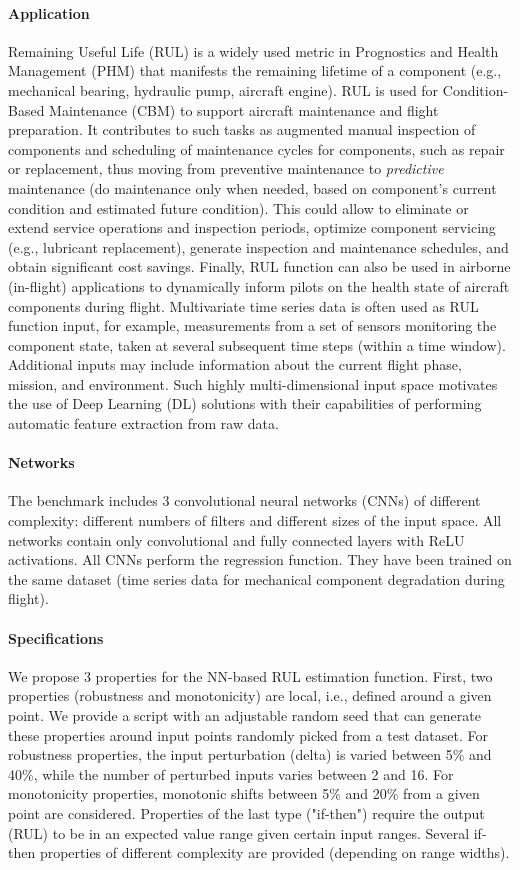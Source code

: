 \documentclass[oneside,11pt,dvipsnames]{book}
\begin{document}
\paragraph*{Application} Remaining Useful Life (RUL) is a widely used metric in Prognostics and Health Management (PHM) that manifests the remaining lifetime of a component (e.g., mechanical bearing, hydraulic pump, aircraft engine). RUL is used for Condition-Based Maintenance (CBM) to support aircraft maintenance and flight preparation. It contributes to such tasks as augmented manual inspection of components and scheduling of maintenance cycles for components, such as repair or replacement, thus moving from preventive maintenance to \emph{predictive} maintenance (do maintenance only when needed, based on component’s current condition and estimated future condition). This could allow to eliminate or extend service operations and inspection periods, optimize component servicing (e.g., lubricant replacement), generate inspection and maintenance schedules, and obtain significant cost savings. Finally, RUL function can also be used in airborne (in-flight) applications to dynamically inform pilots on the health state of aircraft components during flight. Multivariate time series data is often used as RUL function input, for example, measurements from a set of sensors monitoring the component state, taken at several subsequent time steps (within a time window). Additional inputs may include information about the current flight phase, mission, and environment. Such highly multi-dimensional input space motivates the use of Deep Learning (DL) solutions with their capabilities of performing automatic feature extraction from raw data.

\paragraph*{Networks} The benchmark includes 3 convolutional neural networks (CNNs) of different complexity: different numbers of filters and different sizes of the input space. All networks contain only convolutional and fully connected layers with ReLU activations. All CNNs perform the regression function. They have been trained on the same dataset (time series data for mechanical component degradation during flight).

\paragraph*{Specifications} We propose 3 properties for the NN-based RUL estimation function. First, two properties (robustness and monotonicity) are local, i.e., defined around a given point. We provide a script with an adjustable random seed that can generate these properties around input points randomly picked from a test dataset. For robustness properties, the input perturbation (delta) is varied between 5\% and 40\%, while the number of perturbed inputs varies between 2 and 16. For monotonicity properties, monotonic shifts between 5\% and 20\% from a given point are considered. Properties of the last type ("if-then") require the output (RUL) to be in an expected value range given certain input ranges. Several if-then properties of different complexity are provided (depending on range widths).
\end{document}
